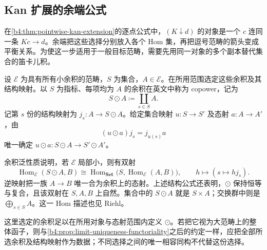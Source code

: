 \subsection{Kan 扩展的余端公式}
\label{b4:subsec:0306:04}

在\cref{b4:thm:pointwise-kan-extension}的逐点公式中，\((K\downarrow d)\) 的对象是一个 \(c\) 连同一条 \(Kc\rightarrow d\)。余端把这些选择分别放入各个 Hom 集，再把逗号范畴的箭头变成平衡关系。为使这一步适用于一般目标范畴，需要先用同一对象的多个副本替代集合的笛卡儿积。

\begin{definition}[集合指标的余积]\label{b4:def:copower}
	设 \(\mathcal E\) 为具有所有小余积的范畴，\(S\) 为集合，\(A\in\mathcal E\)。在所用范围选定这些余积及其结构映射。以 \(S\) 为指标、每项均为 \(A\) 的余积在英文中称为 copower，记为
	\[
		S\odot A\coloneqq\coprod_{s\in S}A.
	\]
	记第 \(s\) 份的结构映射为 \(j_s:A\rightarrow S\odot A\)。给定集合映射 \(u:S\rightarrow S'\) 及态射 \(a:A\rightarrow A'\)，由
	\[
		(u\odot a)j_s=j_{u(s)}a
	\]
	唯一确定 \(u\odot a:S\odot A\rightarrow S'\odot A'\)。
\end{definition}

余积泛性质说明，若 \(\mathcal E\) 局部小，则有双射
\[
	\operatorname{Hom}_{\mathcal E}(S\odot A,B)
	\cong\operatorname{Hom}_{\mathbf{Set}}
	\bigl(S,\operatorname{Hom}_{\mathcal E}(A,B)\bigr),
	\qquad h\longmapsto(s\mapsto hj_s).
\]
逆映射把一族 \(A\rightarrow B\) 唯一合为余积上的态射。上述结构公式还表明，\(\odot\) 保持恒等与复合，且该双射在 \(S,A,B\) 上自然。集合中的 \(S\odot A\) 就是 \(S\times A\)；交换群中则是 \(\bigoplus_{s\in S}A\)。这一 Hom 描述也见 Riehl\cite[Example 3.4.9]{Riehl2016CategoryTheory}。

\ProseParagraphBreak
这里选定的余积足以在所用对象与态射范围内定义 \(\odot\)。若把它视为大范畴上的整体函子，则与\cref{b4:prop:limit-uniqueness-functoriality}之后的约定一样，应把全部所选余积及结构映射作为数据；不同选择之间的唯一相容同构不代替这份选择。

